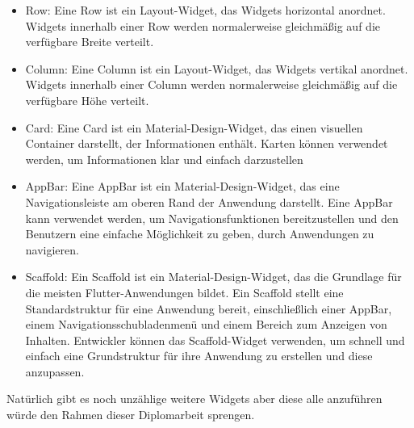 \begin{itemize}
    \item Row: Eine Row ist ein Layout-Widget, das Widgets horizontal anordnet. Widgets innerhalb einer Row werden normalerweise gleichmäßig auf die verfügbare Breite verteilt.
    \item Column: Eine Column ist ein Layout-Widget, das Widgets vertikal anordnet. Widgets innerhalb einer Column werden normalerweise gleichmäßig auf die verfügbare Höhe verteilt.
    \item Card: Eine Card ist ein Material-Design-Widget, das einen visuellen Container darstellt, der Informationen enthält. Karten können verwendet werden, um Informationen klar und einfach darzustellen 
    \item AppBar: Eine AppBar ist ein Material-Design-Widget, das eine Navigationsleiste am oberen Rand der Anwendung darstellt. Eine AppBar kann verwendet werden, um Navigationsfunktionen bereitzustellen und den Benutzern eine einfache Möglichkeit zu geben, durch Anwendungen zu navigieren.
    \item Scaffold: Ein Scaffold ist ein Material-Design-Widget, das die Grundlage für die meisten Flutter-Anwendungen bildet. Ein Scaffold stellt eine Standardstruktur für eine Anwendung bereit, einschließlich einer AppBar, einem Navigationsschubladenmenü und einem Bereich zum Anzeigen von Inhalten. Entwickler können das Scaffold-Widget verwenden, um schnell und einfach eine Grundstruktur für ihre Anwendung zu erstellen und diese anzupassen.
\end{itemize}
Natürlich gibt es noch unzählige weitere Widgets aber diese alle anzuführen würde den Rahmen dieser Diplomarbeit sprengen.



